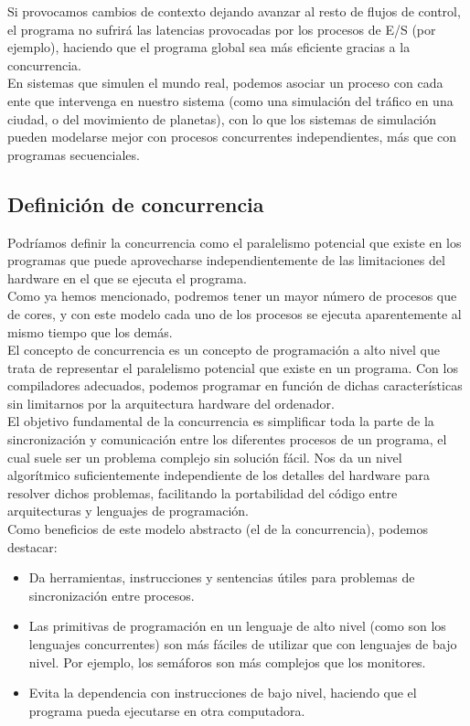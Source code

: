 Si provocamos cambios de contexto dejando avanzar al resto de flujos de control, el programa no sufrirá las latencias provocadas por los procesos de E/S (por ejemplo), haciendo que el programa global sea más eficiente gracias a la concurrencia.\\

En sistemas que simulen el mundo real, podemos asociar un proceso con cada ente que intervenga en nuestro sistema (como una simulación del tráfico en una ciudad, o del movimiento de planetas), con lo que los sistemas de simulación pueden modelarse mejor con procesos concurrentes independientes, más que con programas secuenciales.

\subsection{Definición de concurrencia}
Podríamos definir la concurrencia como el paralelismo potencial que existe en los programas que puede aprovecharse independientemente de las limitaciones del hardware en el que se ejecuta el programa.\\

Como ya hemos mencionado, podremos tener un mayor número de procesos que de cores, y con este modelo cada uno de los procesos se ejecuta aparentemente al mismo tiempo que los demás.\\

El concepto de concurrencia es un concepto de programación a alto nivel que trata de representar el paralelismo potencial que existe en un programa. Con los compiladores adecuados, podemos programar en función de dichas características sin limitarnos por la arquitectura hardware del ordenador.\\

El objetivo fundamental de la concurrencia es simplificar toda la parte de la sincronización y comunicación entre los diferentes procesos de un programa, el cual suele ser un problema complejo sin solución fácil. Nos da un nivel algorítmico suficientemente independiente de los detalles del hardware para resolver dichos problemas, facilitando la portabilidad del código entre arquitecturas y lenguajes de programación.\\

\noindent
Como beneficios de este modelo abstracto (el de la concurrencia), podemos destacar:
\begin{itemize}
    \item Da herramientas, instrucciones y sentencias útiles para problemas de sincronización entre procesos.
    \item Las primitivas de programación en un lenguaje de alto nivel (como son los lenguajes concurrentes) son más fáciles de utilizar que con lenguajes de bajo nivel. Por ejemplo, los semáforos son más complejos que los monitores.
    \item Evita la dependencia con instrucciones de bajo nivel, haciendo que el programa pueda ejecutarse en otra computadora.
\end{itemize}

